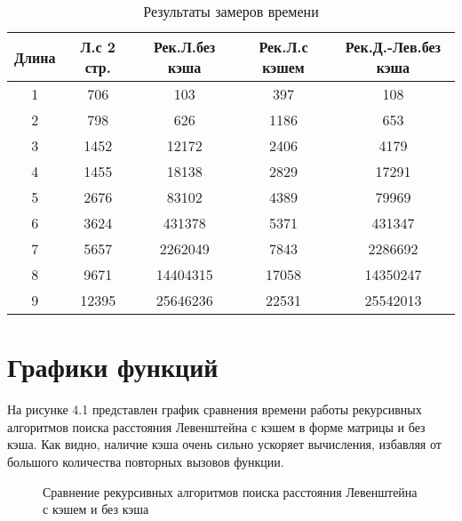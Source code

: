 \begin{table}[H]
	\begin{center}
		\caption{Результаты замеров времени}
		\begin{tabular}{c|c|c|c|c}
			Длина & Л.с 2 стр. & Рек.Л.без кэша & Рек.Л.с кэшем & Рек.Д.-Лев.без кэша\\
			\hline
			1 & 706 & 103 & 397 & 108\\
2 & 798 & 626 & 1186 & 653\\
3 & 1452 & 12172 & 2406 & 4179\\
4 & 1455 & 18138 & 2829 & 17291\\
5 & 2676 & 83102 & 4389 & 79969\\
6 & 3624 & 431378 & 5371 & 431347\\
7 & 5657 & 2262049 & 7843 & 2286692\\
8 & 9671 & 14404315 & 17058 & 14350247\\
9 & 12395 & 25646236 & 22531 & 25542013\\
		\end{tabular}
	\end{center}
\end{table}

\section{Графики функций}

На рисунке 4.1 представлен график сравнения времени работы рекурсивных алгоритмов поиска расстояния Левенштейна с кэшем в форме матрицы и без кэша. Как видно, наличие кэша очень сильно ускоряет вычисления, избавляя от большого количества повторных вызовов функции.

\begin{figure}[H]
	\captionsetup{singlelinecheck = false, justification=centering}
	\centering
		\caption{Сравнение рекурсивных алгоритмов поиска расстояния Левенштейна с кэшем и без кэша}
\end{figure}

